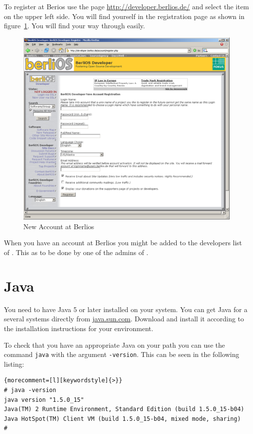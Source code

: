 To register at Berios use the page \url{http://developer.berlios.de/}
and select the item \menu{} on the upper left side. You will find
yourself in the registration page as shown in
figure~\ref{fig:berlios-register}. You will find your way through
easily.
\begin{figure}[htbp]
  \centering  \includegraphics[scale=.33]{image/berlios-register}
  \caption{New Account at Berlios}\label{fig:berlios-register}
\end{figure}

When you have an account at Berlios you might be added to the
developers list of \ExTeX. This as to be done by one of the admins of
\ExTeX.


\section{Java}

You need to have Java 5 or later installed on your
system. You can get Java for a several systems directly from
\url{java.sun.com}. Download and install it according to the
installation instructions for your environment.

To check that you have an appropriate Java on your path you can use
the command \texttt{java} with the argument \texttt{-version}. This
can be seen in the following listing:

%
\begin{lstlisting}{morecomment=[l][keywordstyle]{>}}
# java -version
java version "1.5.0_15"
Java(TM) 2 Runtime Environment, Standard Edition (build 1.5.0_15-b04)
Java HotSpot(TM) Client VM (build 1.5.0_15-b04, mixed mode, sharing)
#
\end{lstlisting}

